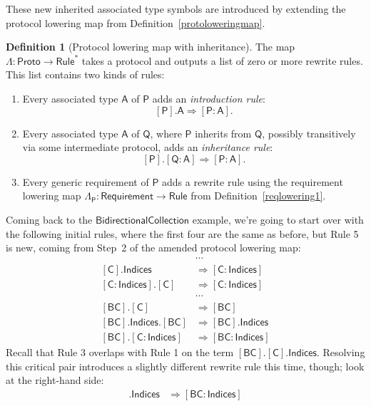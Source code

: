 \documentclass[a4paper,headsepline,bibliography=totoc,toc=flat,fleqn,twoside=semi]{scrbook}
\theoremstyle{definition}
\newtheorem{definition}{Definition}[chapter]
\theoremstyle{definition}
\theoremstyle{definition}
\newcommand{\namesym}[1]{\mathsf{#1}}
\newcommand{\proto}[1]{\bm{\mathsf{#1}}}
\newcommand{\protosym}[1]{[\proto{#1}]}
\newcommand{\assocsym}[2]{[\proto{#1}\colon\namesym{#2}]}
\begin{document}
These new inherited associated type symbols are introduced by extending the protocol lowering map from Definition~\ref{protoloweringmap}.
\begin{definition}[Protocol lowering map with inheritance]\label{protoloweringmap2}
The map $\Lambda\colon\namesym{Proto}\rightarrow\namesym{Rule}^*$ takes a protocol and outputs a list of zero or more rewrite rules. This list contains two kinds of rules:
\begin{enumerate}
\item Every associated type $\namesym{A}$ of $\proto{P}$ adds an \emph{introduction rule}:
\[\protosym{P}.\namesym{A}\Rightarrow\assocsym{P}{A}.\]
\item Every associated type $\namesym{A}$ of $\proto{Q}$, where $\proto{P}$ inherits from $\proto{Q}$, possibly transitively via some intermediate protocol, adds an \emph{inheritance rule}:
\[\protosym{P}.\assocsym{Q}{A}\Rightarrow\assocsym{P}{A}.\]
\item Every generic requirement of $\proto{P}$ adds a rewrite rule using the requirement lowering map $\Lambda_{\proto{P}}:\namesym{Requirement}\rightarrow\namesym{Rule}$ from Definition~\ref{reqlowering1}.
\end{enumerate}
\end{definition}
Coming back to the $\proto{BidirectionalCollection}$ example, we're going to start over with the following initial rules, where the first four are the same as before, but Rule 5 is new, coming from Step~2 of the amended protocol lowering map:
\begin{align}
&\cdots\nonumber\\
\protosym{C}.\namesym{Indices}&\Rightarrow\assocsym{C}{Indices}\tag{1}\\
\assocsym{C}{Indices}.\protosym{C}&\Rightarrow\assocsym{C}{Indices}\tag{2}\\
&\cdots\nonumber\\
\protosym{BC}.\protosym{C}&\Rightarrow\protosym{BC}\tag{3}\\
\protosym{BC}.\namesym{Indices}.\protosym{BC}&\Rightarrow\protosym{BC}.\namesym{Indices}\tag{4}\\
\protosym{BC}.\assocsym{C}{Indices}&\Rightarrow\assocsym{BC}{Indices}\tag{5}
\end{align}
Recall that Rule 3 overlaps with Rule 1 on the term $\protosym{BC}.\protosym{C}.\namesym{Indices}$. Resolving this critical pair introduces a slightly different rewrite rule this time, though; look at the right-hand side:
\begin{align}
\protosym{BC}.\namesym{Indices}&\Rightarrow\assocsym{BC}{Indices}\tag{6}
\end{align}
\end{document}
